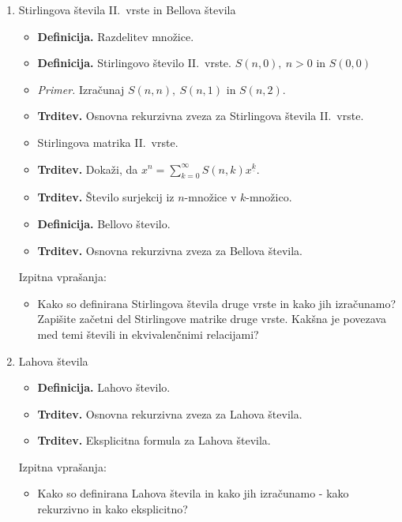 \begin{enumerate}
    \item Stirlingova števila II.\ vrste in Bellova števila
    \begin{itemize}
        \item \colorbox{purple!30}{\textbf{Definicija.}} Razdelitev množice.
        \item \colorbox{purple!30}{\textbf{Definicija.}} Stirlingovo število II.\ vrste. \(S(n,0), \ n > 0\) in \(S(0,0)\)
        \item \colorbox{yellow!30}{\emph{Primer.}} Izračunaj \(S(n,n), \ S(n, 1)\) in \(S(n, 2)\). 
        \item \colorbox{blue!30}{\textbf{Trditev.}} Osnovna rekurzivna zveza za Stirlingova števila II.\ vrste.
        \item Stirlingova matrika II.\ vrste.
        \item \colorbox{blue!30}{\textbf{Trditev.}} Dokaži, da \(x^n=\sum_{k=0}^{\infty} S(n,k) x^{\underline{k}}\).
        \item \colorbox{blue!30}{\textbf{Trditev.}} Število surjekcij iz \(n\)-množice v \(k\)-množico.
        \item \colorbox{purple!30}{\textbf{Definicija.}} Bellovo število.
        \item \colorbox{blue!30}{\textbf{Trditev.}} Osnovna rekurzivna zveza za Bellova števila.
    \end{itemize}

    Izpitna vprašanja:
    \begin{itemize}
        \item Kako so definirana Stirlingova števila druge vrste in kako jih izračunamo? Zapišite začetni del Stirlingove matrike druge vrste. Kakšna je povezava med temi števili in ekvivalenčnimi relacijami?
    \end{itemize}

    \item Lahova števila
    \begin{itemize}
        \item \colorbox{purple!30}{\textbf{Definicija.}} Lahovo število.
        \item \colorbox{blue!30}{\textbf{Trditev.}} Osnovna rekurzivna zveza za Lahova števila.
        \item \colorbox{blue!30}{\textbf{Trditev.}} Eksplicitna formula za Lahova števila.
    \end{itemize}

    Izpitna vprašanja:
    \begin{itemize}
        \item Kako so definirana Lahova števila in kako jih izračunamo - kako rekurzivno in kako eksplicitno?
    \end{itemize}


\end{enumerate}
